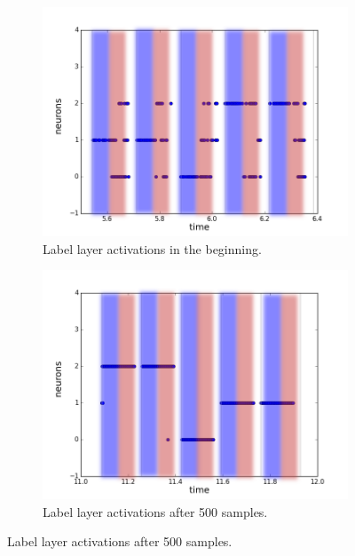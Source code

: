 \begin{figure}[h!]
	\begin{subfigure}[t]{.32\textwidth}
  		\centering
  		\includegraphics[width=.9\linewidth]{imgs/7x7/20076_c.png}
  		\caption{Label layer activations in the beginning.}
  		\label{fig:sub2}
	\end{subfigure}
	\begin{subfigure}[t]{.32\textwidth}
  		\centering
  		\includegraphics[width=.9\linewidth]{imgs/7x7/20946_c.png}
  		\caption{Label layer activations after 500 samples.}
  		\label{fig:sub2}
	\end{subfigure}
	

\end{figure}
